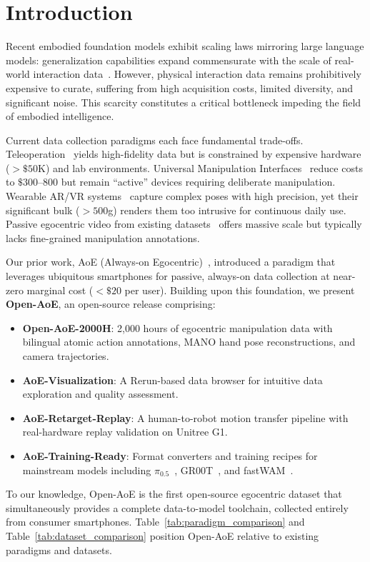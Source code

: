 \section{Introduction}

Recent embodied foundation models exhibit scaling laws mirroring large language models: generalization capabilities expand commensurate with the scale of real-world interaction data~\cite{gen0,luo2025being}. However, physical interaction data remains prohibitively expensive to curate, suffering from high acquisition costs, limited diversity, and significant noise. This scarcity constitutes a critical bottleneck impeding the field of embodied intelligence.

Current data collection paradigms each face fundamental trade-offs. Teleoperation~\cite{chen2025towards,droid2024} yields high-fidelity data but is constrained by expensive hardware ($>\$50$K) and lab environments. Universal Manipulation Interfaces~\cite{chi2024umi,xu2025dexumi} reduce costs to $\$300$--$800$ but remain ``active'' devices requiring deliberate manipulation. Wearable AR/VR systems~\cite{wang2024dexcap,zhong2025humanoidexo} capture complex poses with high precision, yet their significant bulk ($>500$g) renders them too intrusive for continuous daily use. Passive egocentric video from existing datasets~\cite{grauman2022ego4d,damen2018epic} offers massive scale but typically lacks fine-grained manipulation annotations.

Our prior work, AoE (Always-on Egocentric)~\cite{aoe2026}, introduced a paradigm that leverages ubiquitous smartphones for passive, always-on data collection at near-zero marginal cost ($<\$20$ per user). Building upon this foundation, we present \textbf{Open-AoE}, an open-source release comprising:

\begin{itemize}
    \item \textbf{Open-AoE-2000H}: 2,000 hours of egocentric manipulation data with bilingual atomic action annotations, MANO hand pose reconstructions, and camera trajectories.
    \item \textbf{AoE-Visualization}: A Rerun-based data browser for intuitive data exploration and quality assessment.
    \item \textbf{AoE-Retarget-Replay}: A human-to-robot motion transfer pipeline with real-hardware replay validation on Unitree G1.
    \item \textbf{AoE-Training-Ready}: Format converters and training recipes for mainstream models including $\pi_{0.5}$~\cite{pi05}, GR00T~\cite{groot2025}, and fastWAM~\cite{fastwam2025}.
\end{itemize}

To our knowledge, Open-AoE is the first open-source egocentric dataset that simultaneously provides a complete data-to-model toolchain, collected entirely from consumer smartphones. Table~\ref{tab:paradigm_comparison} and Table~\ref{tab:dataset_comparison} position Open-AoE relative to existing paradigms and datasets.
